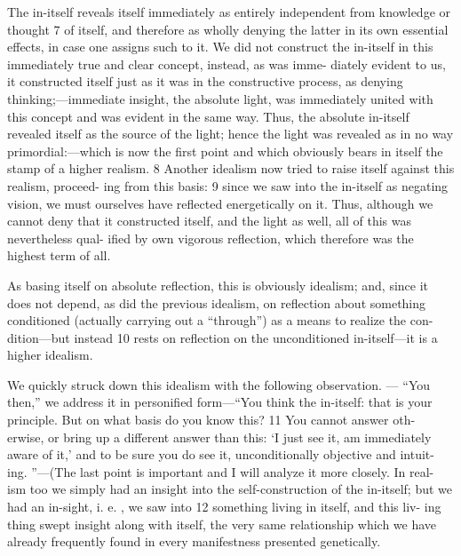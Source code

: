 The in-itself reveals itself immediately as entirely independent from
knowledge or thought 7 of itself, and therefore as wholly denying the latter in
its own essential effects, in case one assigns such to it.
We did not construct
the in-itself in this immediately true and clear concept, instead, as was imme-
diately evident to us, it constructed itself just as it was in the constructive
process, as denying thinking;—immediate insight, the absolute light, was
immediately united with this concept and was evident in the same way.
Thus,
the absolute in-itself revealed itself as the source of the light; hence the light
was revealed as in no way primordial:—which is now the first point and which
obviously bears in itself the stamp of a higher realism.
8
Another idealism now tried to raise itself against this realism, proceed-
ing from this basis: 9 since we saw into the in-itself as negating vision, we must
ourselves have reflected energetically on it.
Thus, although we cannot deny
that it constructed itself, and the light as well, all of this was nevertheless qual-
ified by own vigorous reflection, which therefore was the highest term of all.

As basing itself on absolute reflection, this is obviously idealism; and, since it
does not depend, as did the previous idealism, on reflection about something
conditioned (actually carrying out a “through”) as a means to realize the con-
dition—but instead 10 rests on reflection on the unconditioned in-itself—it is a
higher idealism.

We quickly struck down this idealism with the following observation.
—
“You then,” we address it in personified form—“You think the in-itself: that is
your principle.
But on what basis do you know this? 11 You cannot answer oth-
erwise, or bring up a different answer than this: ‘I just see it, am immediately
aware of it,’ and to be sure you do see it, unconditionally objective and intuit-
ing.
”—(The last point is important and I will analyze it more closely.
In real-
ism too we simply had an insight into the self-construction of the in-itself; but
we had an in-sight, i.
e.
, we saw into 12 something living in itself, and this liv-
ing thing swept insight along with itself, the very same relationship which we
have already frequently found in every manifestness presented genetically.

